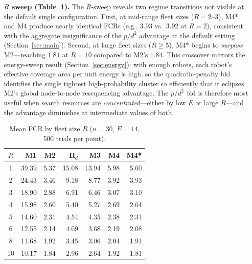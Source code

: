 \begin{doublespacing}
\textbf{$R$ sweep (Table~\ref{tab:r-sweep}).} The $R$-sweep reveals
two regime transitions not visible at the default single configuration.
First, at mid-range fleet sizes ($R = 2$--$3$), M4* and M4 produce
nearly identical FCRs (e.g., $3.93$ vs.\ $3.92$ at $R = 2$),
consistent with the aggregate insignificance of the $p/d^2$ advantage
at the default setting (Section~\ref{sec:main}).  Second, at large
fleet sizes ($R \geq 5$), M4* begins to \emph{surpass} M2---reaching
$1.81$ at $R = 10$ compared to M2's $1.84$.  This crossover mirrors
the energy-sweep result (Section~\ref{sec:energy}): with enough robots,
each robot's effective coverage area per unit energy is high, so the
quadratic-penalty bid identifies the single tightest high-probability
cluster so efficiently that it eclipses M2's global node-to-node
resequencing advantage.  The $p/d^2$ bid is therefore most useful when
search resources are \emph{concentrated}---either by low $E$ or large
$R$---and the advantage diminishes at intermediate values of both.

\begin{table}[ht]
\centering
\caption{Mean FCR by fleet size $R$ ($n = 30$, $E = 14$, 500 trials per point).}
\label{tab:r-sweep}
\vspace{2pt}
\begin{tabular}{@{}crrrrrr@{}}
\toprule
$R$ & M1 & M2 & H$_d$ & M3 & M4 & M4* \\
\midrule
 1 & 39.39 & 5.37 & 15.08 & 13.94 &  5.98 & 5.60 \\
 2 & 24.43 & 3.46 &  9.18 &  8.77 &  3.92 & 3.93 \\
 3 & 18.90 & 2.88 &  6.91 &  6.46 &  3.07 & 3.10 \\
 4 & 15.98 & 2.60 &  5.40 &  5.27 &  2.69 & 2.64 \\
 5 & 14.60 & 2.31 &  4.54 &  4.35 &  2.38 & 2.31 \\
 6 & 12.55 & 2.14 &  4.09 &  3.68 &  2.19 & 2.08 \\
 8 & 11.68 & 1.92 &  3.45 &  3.06 &  2.04 & 1.91 \\
10 & 10.17 & 1.84 &  2.96 &  2.64 &  1.92 & 1.81 \\
\bottomrule
\end{tabular}
\end{table}










\end{doublespacing}
